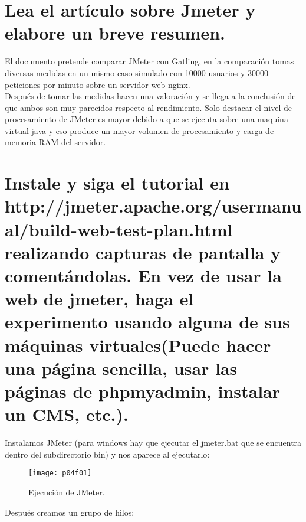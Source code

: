 \section{Lea el artículo sobre Jmeter y elabore un breve resumen.}
El documento pretende comparar JMeter con Gatling, en la comparación tomas diversas medidas en un mismo caso simulado con 10000 usuarios y 30000 peticiones por minuto sobre un servidor web nginx.\\

Después de tomar las medidas hacen una valoración y se llega a la conclusión de que ambos son muy parecidos respecto al rendimiento. Solo destacar el nivel de procesamiento de JMeter es mayor debido a que se ejecuta sobre una maquina virtual java y eso produce un mayor volumen de procesamiento y carga de memoria RAM del servidor.

\clearpage
\section{Instale y siga el tutorial en http://jmeter.apache.org/usermanual/build-web-test-plan.html realizando capturas de pantalla y comentándolas. En vez de usar la web de jmeter, haga el experimento usando alguna de sus máquinas virtuales(Puede hacer una página sencilla, usar las páginas de phpmyadmin, instalar un CMS, etc.).}

Instalamos JMeter (para windows hay que ejecutar el jmeter.bat que se encuentra dentro del subdirectorio bin) y nos aparece al ejecutarlo:
\begin{figure}[H]
	\centering
	\texttt{[image: p04f01]}
	\caption{Ejecución de JMeter.}
	\label{fig:p04f01}
\end{figure}

\clearpage
Después creamos un grupo de hilos:

